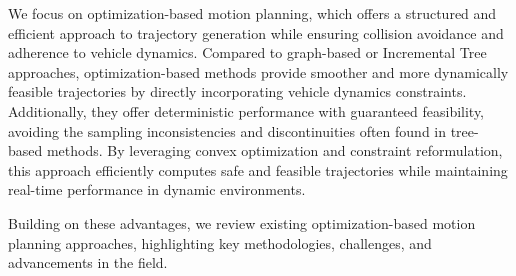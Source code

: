 We focus on optimization-based motion planning, which offers a structured and efficient approach to trajectory generation while ensuring collision
avoidance and adherence to vehicle dynamics.
Compared to graph-based or Incremental Tree approaches, optimization-based methods provide smoother and more dynamically feasible trajectories by
directly incorporating vehicle dynamics constraints.
Additionally, they offer deterministic performance with guaranteed feasibility, avoiding the sampling inconsistencies and discontinuities often found
in tree-based methods.
By leveraging convex optimization and constraint reformulation, this approach efficiently computes safe and feasible trajectories while maintaining
real-time performance in dynamic environments.

Building on these advantages, we review existing optimization-based motion planning approaches, highlighting key methodologies, challenges, and
advancements in the field.

